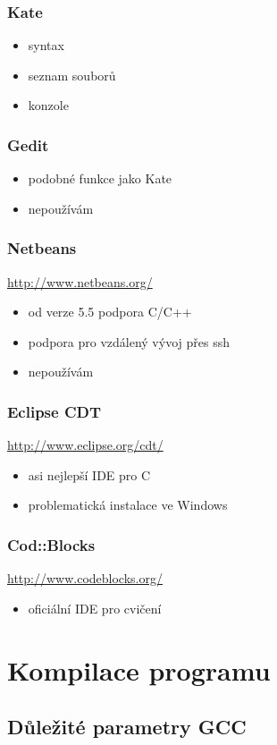 \begin{frame}
	\frametitle{Kate}
	\begin{itemize}
		\item{syntax}
		\item{seznam souborů}
		\item{konzole}
	\end{itemize}
\end{frame}

\begin{frame}
	\frametitle{Gedit}
	\begin{itemize}
		\item{podobné funkce jako Kate}
		\item{nepoužívám}
	\end{itemize}
\end{frame}

\begin{frame}
	\frametitle{Netbeans}
	\href{http://www.netbeans.org/}{http://www.netbeans.org/}
	\begin{itemize}
		\item{od verze 5.5 podpora C/C++}
		\item{podpora pro vzdálený vývoj přes ssh}
		\item{nepoužívám}
	\end{itemize}
\end{frame}

\begin{frame}
	\frametitle{Eclipse CDT}
	\href{http://www.eclipse.org/cdt/}{http://www.eclipse.org/cdt/}
	\begin{itemize}
		\item{asi nejlepší IDE pro C}
		\item{problematická instalace ve Windows}
	\end{itemize}
\end{frame}

\begin{frame}
	\frametitle{Cod::Blocks}
	\href{http://www.codeblocks.org/}{http://www.codeblocks.org/}
	\begin{itemize}
		\item{oficiální IDE pro cvičení}
	\end{itemize}
\end{frame}

\section{Kompilace programu}
\subsection{Důležité parametry GCC}

